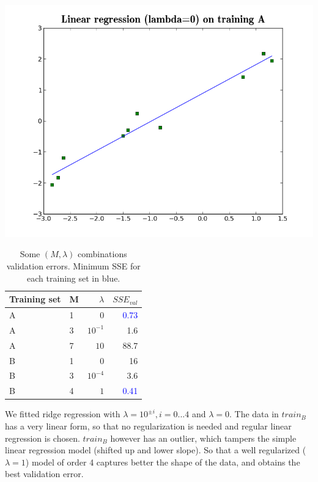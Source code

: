 \documentclass[twoside]{article}
\begin{document}
\includegraphics[scale=0.17]{./img/ridge_traina_lin.png}
\endgroup


\begin{table}[H]
\caption{Some $(M, \lambda)$ combinations validation errors. Minimum SSE for each training set in blue.}
\centering
\begin{tabular}{llrr}
\toprule
Training set & M & $\lambda$ & $SSE_{val}$ \\
\midrule
A & 1 & 0 & \textcolor{blue}{0.73}\\
A & 3 & $10^{-1}$ &  1.6\\
A & 7 & $10$ & 88.7\\
B & 1 & $0$ & 16\\
B & 3 & $10^{-4}$ & 3.6\\
B & 4 & $1$ & \textcolor{blue}{0.41}\\
\bottomrule
\end{tabular}
\end{table}

We fitted ridge regression with $\lambda=10^{\pm i}, i=0...4$ and $\lambda=0$. The data in $train_B$ has a very linear form, so that no regularization is needed and regular linear regression is chosen. $train_B$ however has an outlier, which tampers the simple linear regression model (shifted up and lower slope). So that a well regularized ($\lambda = 1$) model of order 4 captures better the shape of the data, and obtains the best validation error.
\end{document}
